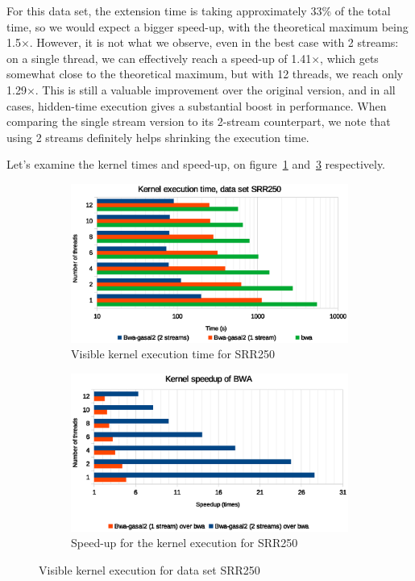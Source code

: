 For this data set, the extension time is taking approximately 33\% of the total time, so we would expect a bigger speed-up, with the theoretical maximum being 1.5$\times$. However, it is not what we observe, even in the best case with 2 streams: on a single thread, we can effectively reach a speed-up of 1.41$\times$, which gets somewhat close to the theoretical maximum, but with 12 threads, we reach only 1.29$\times$. This is still a valuable improvement over the original version, and in all cases, hidden-time execution gives a substantial boost in performance. When comparing the single stream version to its 2-stream counterpart, we note that using 2 streams definitely helps shrinking the execution time.

Let's examine the kernel times and speed-up, on figure~\ref{fig:kernel-exec-time-srr250} and~\ref{fig:kernel-exec-speed-up-srr250} respectively.


\begin{figure}[p]
	\centering
	\begin{subfigure}[t]{1\textwidth}
		\centering
		\includegraphics[width=1\textwidth]{srr250/kernel-exec-time-srr250}
		\caption{Visible kernel execution time for SRR250}
		\label{fig:kernel-exec-time-srr250}
	\end{subfigure}%
	
	\begin{subfigure}[b]{1\textwidth}
		\centering
		\includegraphics[width=1\textwidth]{srr250/kernel-exec-speed-up-srr250}
		\caption{Speed-up for the kernel execution for SRR250}
		\label{fig:kernel-exec-speed-up-srr250}
	\end{subfigure}
	\caption{Visible kernel execution for data set SRR250}
\end{figure}

